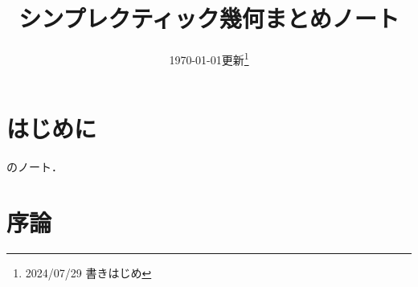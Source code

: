\theoremstyle{mystyle}
\newtheorem{AXM}{公理}[section]
\newtheorem{DFN}[Axiom]{定義}
\newtheorem{THM}[Axiom]{定理}
\newtheorem*{THM*}{定理}
\newtheorem{STT}{主張}[chapter]
\newtheorem*{STT*}{主張}
\newtheorem{PRP}[Axiom]{命題}
\newtheorem{LMM}[Axiom]{補題}
\newtheorem*{LMM*}{補題}
\newtheorem{CRL}[Axiom]{系}
\newtheorem{EG}[Axiom]{例}
\newtheorem{CNV}[Axiom]{規約}
\newtheorem{NTT}[Axiom]{記法}
\newtheorem{RMK}[Axiom]{注意}
\newtheorem{CMT}{コメント}[chapter]
\newtheorem*{CMT*}{コメント}
\newtheorem{FACT}{事実}
\newtheorem*{FACT*}{事実}
\newtheorem{EXC}{演習}[chapter]




\def\inner<#1>{\langle #1 \rangle}








\title{シンプレクティック幾何まとめノート}
\author{}
\date{\today 更新\footnote{2024/07/29 書きはじめ}}

\maketitle


\chapter*{はじめに}
\cite{HZ94}のノート．






\chapter{序論}
